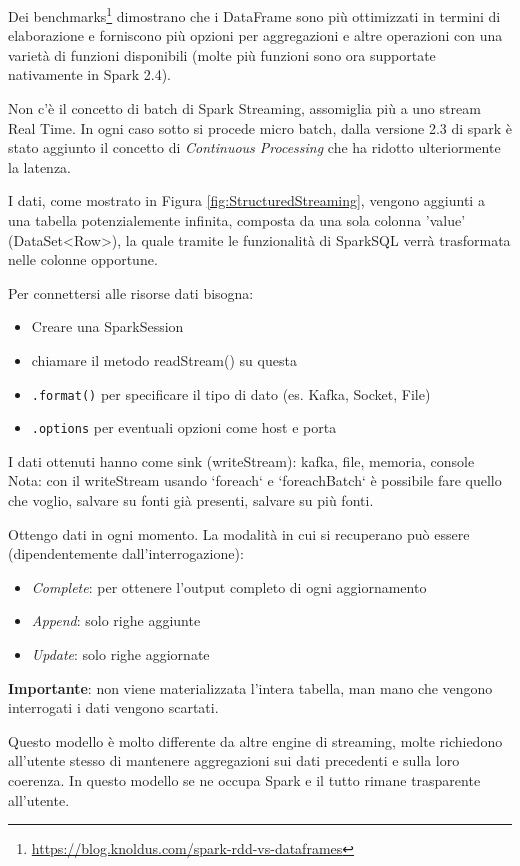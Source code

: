 \documentclass[12pt,italian]{article}
\begin{document}
Dei benchmarks\footnote{\url{https://blog.knoldus.com/spark-rdd-vs-dataframes}} dimostrano che i DataFrame sono più ottimizzati in termini di elaborazione e forniscono più opzioni per aggregazioni e altre operazioni con una varietà di funzioni disponibili (molte più funzioni sono ora supportate nativamente in Spark 2.4).

Non c'è il concetto di batch di Spark Streaming, assomiglia più a uno stream Real Time.
In ogni caso sotto si procede micro batch, dalla versione 2.3 di spark è stato aggiunto il concetto di \textit{Continuous Processing} che ha ridotto ulteriormente la latenza.

I dati, come mostrato in Figura \ref{fig:StructuredStreaming}, vengono aggiunti a una tabella potenzialemente infinita, composta da una sola colonna 'value' (DataSet<Row>), 
la quale tramite le funzionalità di SparkSQL verrà trasformata nelle colonne opportune.

Per connettersi alle risorse dati bisogna:
\begin{itemize}
	\item Creare una SparkSession
	\item chiamare il metodo readStream() su questa
	\item \texttt{.format()} per specificare il tipo di dato (es. Kafka, Socket, File)
	\item \texttt{.options} per eventuali opzioni come host e porta
\end{itemize}

I dati ottenuti hanno come sink (writeStream): kafka, file, memoria, console
Nota: con il writeStream usando `foreach` e `foreachBatch` è possibile fare quello che voglio, salvare su fonti già presenti, salvare su più fonti.

Ottengo dati in ogni momento.
La modalità in cui si recuperano può essere (dipendentemente dall'interrogazione): 
\begin{itemize}
	\item \textit{Complete}: per ottenere l'output completo di ogni aggiornamento
	\item \textit{Append}: solo righe aggiunte
	\item \textit{Update}: solo righe aggiornate
\end{itemize}

\textbf{Importante}: non viene materializzata l'intera tabella, man mano che vengono interrogati i dati vengono scartati. 

Questo modello è molto differente da altre engine di streaming, molte richiedono all'utente stesso di mantenere aggregazioni sui dati precedenti e sulla loro coerenza.
In questo modello se ne occupa Spark e il tutto rimane trasparente all'utente.
\end{document}
